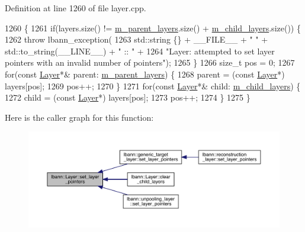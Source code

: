 Definition at line 1260 of file layer.\+cpp.


\begin{DoxyCode}
1260                                                        \{
1261   \textcolor{keywordflow}{if}(layers.size() != \hyperlink{classlbann_1_1Layer_a3fa7c6cf1a22bb14ab0e85e3dc6027c5}{m\_parent\_layers}.size() + \hyperlink{classlbann_1_1Layer_ae348c0d2b4d05f74d809d09debb633c0}{m\_child\_layers}.size()) \{
1262     \textcolor{keywordflow}{throw} lbann\_exception(
1263       std::string \{\} + \_\_FILE\_\_ + \textcolor{stringliteral}{" "} + std::to\_string(\_\_LINE\_\_) + \textcolor{stringliteral}{" :: "} +
1264       \textcolor{stringliteral}{"Layer: attempted to set layer pointers with an invalid number of pointers"});
1265   \}
1266   \textcolor{keywordtype}{size\_t} pos = 0;
1267   \textcolor{keywordflow}{for}(\textcolor{keyword}{const} \hyperlink{classlbann_1_1Layer_a24e9c82354a0a2af1b70cbca2211e7d4}{Layer}*& parent: \hyperlink{classlbann_1_1Layer_a3fa7c6cf1a22bb14ab0e85e3dc6027c5}{m\_parent\_layers}) \{
1268     parent = (\textcolor{keyword}{const} \hyperlink{classlbann_1_1Layer_a24e9c82354a0a2af1b70cbca2211e7d4}{Layer}*) layers[pos];
1269     pos++;
1270   \}
1271   \textcolor{keywordflow}{for}(\textcolor{keyword}{const} \hyperlink{classlbann_1_1Layer_a24e9c82354a0a2af1b70cbca2211e7d4}{Layer}*& child: \hyperlink{classlbann_1_1Layer_ae348c0d2b4d05f74d809d09debb633c0}{m\_child\_layers}) \{
1272     child = (\textcolor{keyword}{const} \hyperlink{classlbann_1_1Layer_a24e9c82354a0a2af1b70cbca2211e7d4}{Layer}*) layers[pos];
1273     pos++;
1274   \}
1275 \}
\end{DoxyCode}
Here is the caller graph for this function\+:\nopagebreak
\begin{figure}[H]
\begin{center}
\leavevmode
\includegraphics[width=350pt]{classlbann_1_1Layer_a001ea76cdd05e2d0d475f408f24702ee_icgraph}
\end{center}
\end{figure}
\mbox{\label{classlbann_1_1Layer_a8eed87b25ea902b223c6b7a23abf78b3}} 
